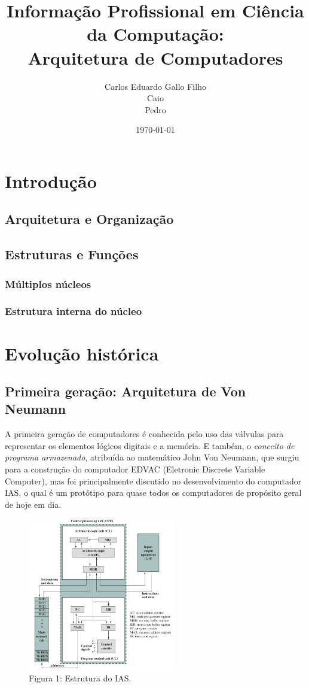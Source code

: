 \documentclass{article}
\title{Informação Profissional em Ciência da Computação:\\
       Arquitetura de Computadores}
\author{Carlos Eduardo Gallo Filho \\
        Caio \\
        Pedro}
\date{\today}
\begin{document}
\maketitle

\section{Introdução}
\subsection{Arquitetura e Organização}
\subsection{Estruturas e Funções}
\subsubsection{Múltiplos núcleos}
\subsubsection{Estrutura interna do núcleo}

\section{Evolução histórica}
\subsection{Primeira geração: Arquitetura de Von Neumann}
A primeira geração de computadores é conhecida pelo uso das válvulas para
representar os elementos lógicos digitais e a memória. E também, o
\textit{conceito de programa armazenado}, atribuída ao matemático John Von
Neumann, que surgiu para a construção do computador EDVAC (Eletronic Discrete
Variable Computer), mas foi principalmente discutido no desenvolvimento do
computador IAS, o qual é um protótipo para quase todos os computadores de
propósito geral de hoje em dia.

\begin{figure}[h]
    \caption{Figura 1: Estrutura do IAS.}
    \centering
    \includegraphics[width=0.58\textwidth]{ias.png}
\end{figure}
\end{document}

